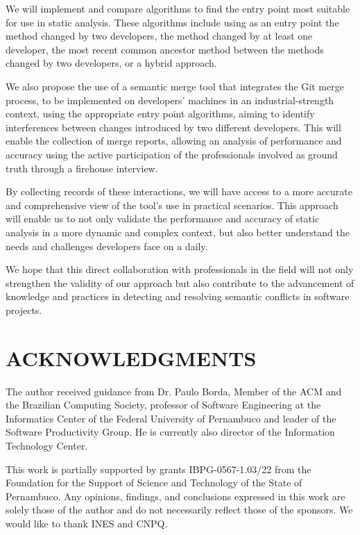 \documentclass[sigconf,review]{acmart}
\begin{document}
We will implement and compare algorithms to find the entry point most suitable for use in static analysis. These algorithms include using as an entry point the method changed by two developers, the method changed by at least one developer, the most recent common ancestor method between the methods changed by two developers, or a hybrid approach.

We also propose the use of a semantic merge tool that integrates the Git merge process, to be implemented on developers' machines in an industrial-strength context, using the appropriate entry point algorithms, aiming to identify interferences between changes introduced by two different developers. This will enable the collection of merge reports, allowing an analysis of performance and accuracy using the active participation of the professionals involved as ground truth through a firehouse interview. 

By collecting records of these interactions, we will have access to a more accurate and comprehensive view of the tool's use in practical scenarios. This approach will enable us to not only validate the performance and accuracy of static analysis in a more dynamic and complex context, but also better understand the needs and challenges developers face on a daily.

We hope that this direct collaboration with professionals in the field will not only strengthen the validity of our approach but also contribute to the advancement of knowledge and practices in detecting and resolving semantic conflicts in software projects.

\section*{ACKNOWLEDGMENTS}
The author received guidance from Dr. Paulo Borda, Member of the ACM and the Brazilian Computing Society, professor of Software Engineering at the Informatics Center of the Federal University of Pernambuco and leader of the Software Productivity Group. He is currently also director of the Information Technology Center.

This work is partially supported by grants IBPG-0567-1.03/22 from the Foundation for the Support of Science and Technology of the State of Pernambuco. Any opinions, findings, and conclusions expressed in this work are solely those of the author and do not necessarily reflect those of the sponsors. We would like to thank INES and CNPQ.




\end{document}
